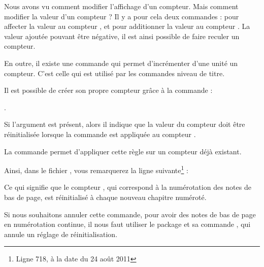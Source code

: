 Nous avons vu comment modifier l'affichage d'un compteur. Mais comment modifier la valeur d'un compteur ? Il y a pour cela deux commandes :  pour affecter la valeur  au compteur , et  pour additionner la valeur  au compteur . La valeur ajoutée pouvant être négative, il est ainsi possible de faire reculer un compteur.

En outre, il existe une commande  qui permet d'incrémenter d'une unité un compteur. C'est celle qui est utilisé par les commandes niveau de titre.



Il est possible de créer son propre compteur grâce à la commande :

 . 
 
Si l'argument  est présent, alors il indique que la valeur du compteur  doit être réinitialisée lorsque la commande  est appliquée au compteur .

La commande    permet d'appliquer cette règle sur un compteur déjà existant.

Ainsi, dans le fichier , vous remarquerez la ligne suivante\footnote{Ligne 718, à la date du 24 août 2011}  :

\begin{latexcode}
\end{latexcode} 

Ce qui signifie que le compteur  , qui correspond à la numérotation des notes de bas de page, est réinitialisé à chaque nouveau chapitre numéroté. 

Si nous souhaitons annuler cette commande, pour avoir des notes de bas de page en numérotation continue, il nous faut utiliser le package  et sa commande , qui annule un réglage de réinitialisation.

\begin{latexcode}
\usepackage{remreset}
\makeatletter
{}
\makeatother
\end{latexcode}
